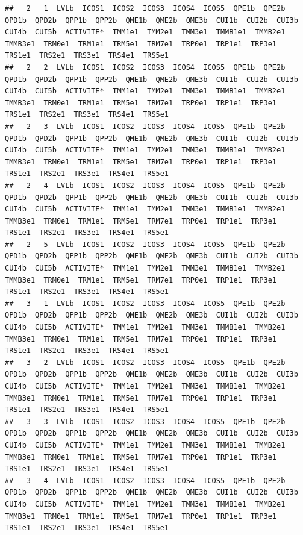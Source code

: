 \documentclass[11pt,a4paper, x11names]{article}\usepackage[]{graphicx}\usepackage[]{color}
\makeatletter
\newenvironment{kframe}{%
 \def\at@end@of@kframe{}%
 \ifinner\ifhmode%
  \def\at@end@of@kframe{\end{minipage}}%
  \begin{minipage}{\columnwidth}%
 \fi\fi%
 \def\FrameCommand##1{\hskip\@totalleftmargin \hskip-\fboxsep
 \colorbox{shadecolor}{##1}\hskip-\fboxsep
     \hskip-\linewidth \hskip-\@totalleftmargin \hskip\columnwidth}%
 \MakeFramed {\advance\hsize-\width
   \@totalleftmargin\z@ \linewidth\hsize
   \@setminipage}}%
 {\par\unskip\endMakeFramed%
 \at@end@of@kframe}
\newenvironment{knitrout}{}{} %
\makeatother
\begin{document}
\begin{knitrout}
\begin{kframe}
\begin{verbatim}
##   2   1  LVLb  ICOS1  ICOS2  ICOS3  ICOS4  ICOS5  QPE1b  QPE2b  QPD1b  QPD2b  QPP1b  QPP2b  QME1b  QME2b  QME3b  CUI1b  CUI2b  CUI3b  CUI4b  CUI5b  ACTIVITE*  TMM1e1  TMM2e1  TMM3e1  TMMB1e1  TMMB2e1  TMMB3e1  TRM0e1  TRM1e1  TRM5e1  TRM7e1  TRP0e1  TRP1e1  TRP3e1  TRS1e1  TRS2e1  TRS3e1  TRS4e1  TRS5e1
##   2   2  LVLb  ICOS1  ICOS2  ICOS3  ICOS4  ICOS5  QPE1b  QPE2b  QPD1b  QPD2b  QPP1b  QPP2b  QME1b  QME2b  QME3b  CUI1b  CUI2b  CUI3b  CUI4b  CUI5b  ACTIVITE*  TMM1e1  TMM2e1  TMM3e1  TMMB1e1  TMMB2e1  TMMB3e1  TRM0e1  TRM1e1  TRM5e1  TRM7e1  TRP0e1  TRP1e1  TRP3e1  TRS1e1  TRS2e1  TRS3e1  TRS4e1  TRS5e1
##   2   3  LVLb  ICOS1  ICOS2  ICOS3  ICOS4  ICOS5  QPE1b  QPE2b  QPD1b  QPD2b  QPP1b  QPP2b  QME1b  QME2b  QME3b  CUI1b  CUI2b  CUI3b  CUI4b  CUI5b  ACTIVITE*  TMM1e1  TMM2e1  TMM3e1  TMMB1e1  TMMB2e1  TMMB3e1  TRM0e1  TRM1e1  TRM5e1  TRM7e1  TRP0e1  TRP1e1  TRP3e1  TRS1e1  TRS2e1  TRS3e1  TRS4e1  TRS5e1
##   2   4  LVLb  ICOS1  ICOS2  ICOS3  ICOS4  ICOS5  QPE1b  QPE2b  QPD1b  QPD2b  QPP1b  QPP2b  QME1b  QME2b  QME3b  CUI1b  CUI2b  CUI3b  CUI4b  CUI5b  ACTIVITE*  TMM1e1  TMM2e1  TMM3e1  TMMB1e1  TMMB2e1  TMMB3e1  TRM0e1  TRM1e1  TRM5e1  TRM7e1  TRP0e1  TRP1e1  TRP3e1  TRS1e1  TRS2e1  TRS3e1  TRS4e1  TRS5e1
##   2   5  LVLb  ICOS1  ICOS2  ICOS3  ICOS4  ICOS5  QPE1b  QPE2b  QPD1b  QPD2b  QPP1b  QPP2b  QME1b  QME2b  QME3b  CUI1b  CUI2b  CUI3b  CUI4b  CUI5b  ACTIVITE*  TMM1e1  TMM2e1  TMM3e1  TMMB1e1  TMMB2e1  TMMB3e1  TRM0e1  TRM1e1  TRM5e1  TRM7e1  TRP0e1  TRP1e1  TRP3e1  TRS1e1  TRS2e1  TRS3e1  TRS4e1  TRS5e1
##   3   1  LVLb  ICOS1  ICOS2  ICOS3  ICOS4  ICOS5  QPE1b  QPE2b  QPD1b  QPD2b  QPP1b  QPP2b  QME1b  QME2b  QME3b  CUI1b  CUI2b  CUI3b  CUI4b  CUI5b  ACTIVITE*  TMM1e1  TMM2e1  TMM3e1  TMMB1e1  TMMB2e1  TMMB3e1  TRM0e1  TRM1e1  TRM5e1  TRM7e1  TRP0e1  TRP1e1  TRP3e1  TRS1e1  TRS2e1  TRS3e1  TRS4e1  TRS5e1
##   3   2  LVLb  ICOS1  ICOS2  ICOS3  ICOS4  ICOS5  QPE1b  QPE2b  QPD1b  QPD2b  QPP1b  QPP2b  QME1b  QME2b  QME3b  CUI1b  CUI2b  CUI3b  CUI4b  CUI5b  ACTIVITE*  TMM1e1  TMM2e1  TMM3e1  TMMB1e1  TMMB2e1  TMMB3e1  TRM0e1  TRM1e1  TRM5e1  TRM7e1  TRP0e1  TRP1e1  TRP3e1  TRS1e1  TRS2e1  TRS3e1  TRS4e1  TRS5e1
##   3   3  LVLb  ICOS1  ICOS2  ICOS3  ICOS4  ICOS5  QPE1b  QPE2b  QPD1b  QPD2b  QPP1b  QPP2b  QME1b  QME2b  QME3b  CUI1b  CUI2b  CUI3b  CUI4b  CUI5b  ACTIVITE*  TMM1e1  TMM2e1  TMM3e1  TMMB1e1  TMMB2e1  TMMB3e1  TRM0e1  TRM1e1  TRM5e1  TRM7e1  TRP0e1  TRP1e1  TRP3e1  TRS1e1  TRS2e1  TRS3e1  TRS4e1  TRS5e1
##   3   4  LVLb  ICOS1  ICOS2  ICOS3  ICOS4  ICOS5  QPE1b  QPE2b  QPD1b  QPD2b  QPP1b  QPP2b  QME1b  QME2b  QME3b  CUI1b  CUI2b  CUI3b  CUI4b  CUI5b  ACTIVITE*  TMM1e1  TMM2e1  TMM3e1  TMMB1e1  TMMB2e1  TMMB3e1  TRM0e1  TRM1e1  TRM5e1  TRM7e1  TRP0e1  TRP1e1  TRP3e1  TRS1e1  TRS2e1  TRS3e1  TRS4e1  TRS5e1

\end{verbatim}
\end{kframe}
\end{knitrout}
\end{document}
